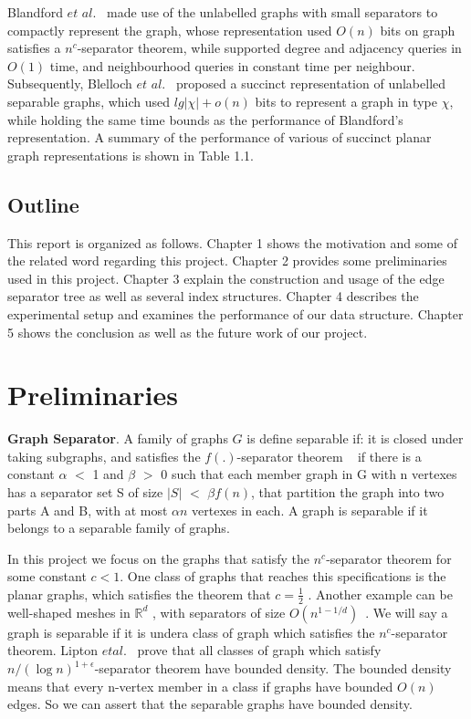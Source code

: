 \documentclass[12pt,glossary]{dalthesis}
\begin{document}
\bigskip

Blandford $et$ $al.$~\cite{compact-representation} made use of the unlabelled graphs with small separators to compactly represent the graph, whose representation used $O(n)$ bits on graph satisfies a $n^{c}$-separator theorem, while supported degree and adjacency queries in $O(1)$ time, and neighbourhood queries in constant time per neighbour. Subsequently, Blelloch $et$ $al.$~\cite{succinct-representation} proposed a succinct representation of unlabelled separable graphs, which used $lg| \chi |+ o(n)$ bits to represent a graph in type $\chi$, while holding the same time bounds as the performance of Blandford's representation. A summary of the performance of various of succinct planar graph representations is shown in Table 1.1.
        

\section{Outline}
This report is organized as follows. Chapter 1 shows the motivation and some of the related word regarding this project. Chapter 2 provides some preliminaries used in this project. Chapter 3 explain the construction and usage of the edge separator tree as well as several index structures. Chapter 4 describes the experimental setup and examines the performance of our data structure. Chapter 5 shows the conclusion as well as the future work of our project.


\chapter{Preliminaries}

\textbf{Graph Separator}. A family of graphs $G$ is define separable if: it is closed under taking subgraphs, and satisfies the $f(.)$-separator theorem ~\cite{separator-theorem} if there is a constant $\alpha$ $<$ 1 and $\beta$ $>$ 0 such that each member graph in G with n vertexes has a separator set S of size $|S|$ $<$ $\beta f(n)$, that partition the graph into two parts A and B, with at most $\alpha n$ vertexes in each. A graph is separable if it belongs to a separable family of graphs. 

\bigskip
\bigskip

In this project we focus on the graphs that satisfy the $n^{c}$-separator theorem for some constant $c < 1$. One class of graphs that reaches this specifications is the planar graphs, which satisfies the theorem that $c = \frac{1}{2}$ . Another example can be well-shaped meshes in $\mathbb{R}^{d}$ , with separators of size $O(n^{1-1/d})$~\cite{ separators-sphere-packing}. We will say a graph is separable if it is undera class of graph which satisfies the $n^{c}$-separator theorem. Lipton $et al$.~\cite{Nested-Dissection} prove that all classes of graph which satisfy $n/(\log n )^{1+\epsilon}$-separator theorem have bounded density. The bounded density means that every n-vertex member in a class if graphs have bounded $O(n)$ edges. So we can assert that the separable graphs have bounded density.
\end{document}
